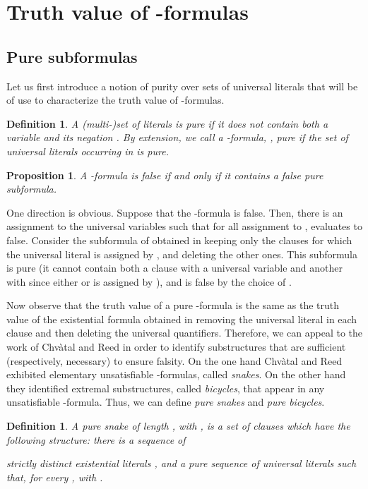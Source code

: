 \documentclass[aop,noinfoline]{imsart}
\newtheorem{proposition}[theorem]{Proposition}
\newtheorem{definition}[theorem]{Definition}
\renewcommand{\Box}{{\vrule width0.6ex height1em depth0cm}}
\newenvironment{proof}{\noindent{\bf Proof:}}{\hfill \Box}
\begin{document}
\section{Truth value  of  -formulas}\label{sec:truth_char}

 
\subsection{Pure subformulas}\label{subsec:pure}

Let us first introduce a notion of purity over sets of universal literals that will be of use to characterize the truth value  of -formulas.

\begin{definition}
A (multi-)set of literals is \emph{pure} if it does not contain both a variable  and its negation . 
By extension, we call a  -formula, , \emph{pure} if the set of universal literals occurring in  is pure.
\end{definition}

\begin{proposition}\label{prop:truth_char}
 A  -formula is false if and only if it contains a false pure subformula.
\end{proposition}
\begin{proof}
 One direction is obvious. Suppose that the -formula  is false. Then, there is an assignment  to the universal variables  such that for all assignment to ,  evaluates to false. Consider the subformula of  obtained in keeping only the clauses for which the universal literal is assigned  by , and deleting the other ones. This subformula is pure (it cannot contain both a clause with a universal variable  and another with  since either  or  is assigned  by ), and is false by the choice of . 
\end{proof}
\medskip

Now observe that the truth value of a pure  -formula  is the same as the truth value of the existential  formula  obtained in removing the universal literal in each clause and then deleting the universal quantifiers. Therefore, we can appeal to the work of Chv\`atal and Reed \cite{ChvatalR-92} in order to identify substructures that are sufficient (respectively, necessary) to ensure falsity.
On the one hand Chv\`atal and Reed exhibited elementary unsatisfiable -formulas, called \emph{snakes}. On the other hand they identified extremal substructures, called \emph{bicycles}, that appear  in any unsatisfiable -formula. Thus, we can define \emph{ pure snakes} and \emph{pure bicycles}.
\begin{definition}
  A pure \emph{snake}  of length , with ,  is a set
  of   clauses  which have the following
  structure: there is a sequence of  
 
strictly distinct existential literals , and a pure sequence of  universal literals   such
that, for every ,  with .
\end{definition}
\end{document}

